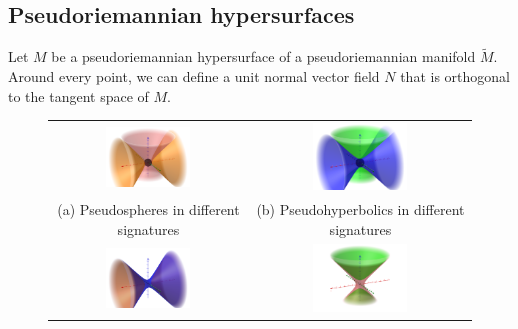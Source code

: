 \documentclass{report}
\begin{document}
\subsection{Pseudoriemannian hypersurfaces}
Let $M$ be a pseudoriemannian hypersurface of a pseudoriemannian manifold $\tilde M$.
Around every point, we can define a unit normal vector field $N$ that is orthogonal to the tangent space of $M$.
\begin{figure}[ht]
    \centering
    \begin{tabular}{cc}
        \includegraphics[width=0.45\textwidth]{Pseudospheres/pseudospheres.png} &
        \includegraphics[width=0.45\textwidth]{Pseudospheres/pseudohyperbolics.png} \\
        \small (a) Pseudospheres in different signatures  &
        \small (b) Pseudohyperbolics in different signatures \\
        \includegraphics[width=0.45\textwidth]{Pseudospheres/H_1_1_S_0_2.png} &
        \includegraphics[width=0.45\textwidth]{Pseudospheres/H_2_0_S_1_1.png} \\

\end{tabular}
\end{figure}
\end{document}
